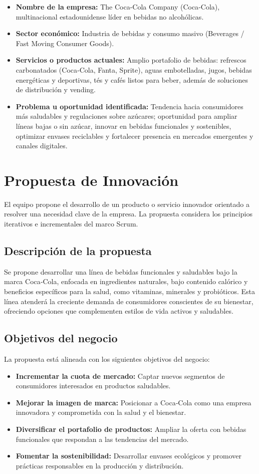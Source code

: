 \documentclass{article}
\begin{document}
\begin{itemize}
\item \textbf{Nombre de la empresa:} The Coca-Cola Company (Coca‑Cola), multinacional estadounidense líder en bebidas no alcohólicas.
\item \textbf{Sector económico:} Industria de bebidas y consumo masivo (Beverages / Fast Moving Consumer Goods).
\item \textbf{Servicios o productos actuales:} Amplio portafolio de bebidas: refrescos carbonatados (Coca‑Cola, Fanta, Sprite), aguas embotelladas, jugos, bebidas energéticas y deportivas, tés y cafés listos para beber, además de soluciones de distribución y vending.
\item \textbf{Problema u oportunidad identificada:} Tendencia hacia consumidores más saludables y regulaciones sobre azúcares; oportunidad para ampliar líneas bajas o sin azúcar, innovar en bebidas funcionales y sostenibles, optimizar envases reciclables y fortalecer presencia en mercados emergentes y canales digitales.
\end{itemize}


\section{Propuesta de Innovación}
El equipo propone el desarrollo de un producto o servicio innovador orientado a resolver una necesidad clave de la empresa. La propuesta considera los principios iterativos e incrementales del marco Scrum.


\subsection{Descripción de la propuesta}
Se propone desarrollar una línea de bebidas funcionales y saludables bajo la marca Coca‑Cola, enfocada en ingredientes naturales, bajo contenido calórico y beneficios específicos para la salud, como vitaminas, minerales y probióticos. Esta línea atenderá la creciente demanda de consumidores conscientes de su bienestar, ofreciendo opciones que complementen estilos de vida activos y saludables.


\subsection{Objetivos del negocio}
La propuesta está alineada con los siguientes objetivos del negocio:


\begin{itemize}
\item \textbf{Incrementar la cuota de mercado:} Captar nuevos segmentos de consumidores interesados en productos saludables.
\item \textbf{Mejorar la imagen de marca:} Posicionar a Coca‑Cola como una empresa innovadora y comprometida con la salud y el bienestar.
\item \textbf{Diversificar el portafolio de productos:} Ampliar la oferta con bebidas funcionales que respondan a las tendencias del mercado.
\item \textbf{Fomentar la sostenibilidad:} Desarrollar envases ecológicos y promover prácticas responsables en la producción y distribución.
\end{itemize}
\end{document}

